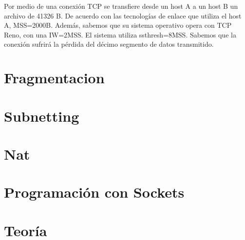 \documentclass[titlepage,a4paper]{article}
\begin{document}
Por medio de una conexión TCP se transfiere desde un host A a un host B un archivo de 41326 B. De acuerdo con las tecnologías de enlace que utiliza el host A, MSS=2000B. Además, sabemos que su sistema operativo opera con TCP Reno, con una IW=2MSS. El sistema utiliza ssthresh=8MSS. Sabemos que la conexión sufrirá la pérdida del décimo segmento de datos transmitido.

\section{Fragmentacion}\label{sec:fragmentacion}



\section{Subnetting}\label{sec:subnetting}



\section{Nat}







\section{Programación con Sockets}




\section{Teoría}\label{sec:teoria}


\end{document}
